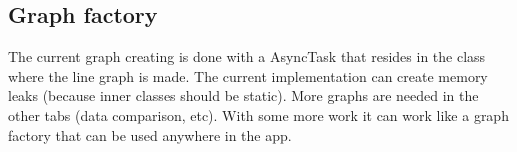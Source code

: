 \subsection{Graph factory}
The current graph creating is done with a AsyncTask that resides in the class where the line graph is made. The current implementation can create memory leaks (because inner classes should be static). More graphs are needed in the other tabs (data comparison, etc). With some more work it can work like a graph factory that can be used anywhere in the app. 
